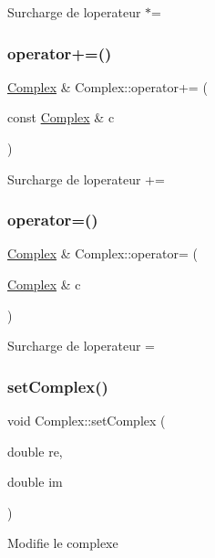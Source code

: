 Surcharge de l\textquotesingle{}operateur $\ast$= \mbox{\label{classComplex_ae567e20c39745c1bfe8f07be126a5fff}} 
\subsubsection{\texorpdfstring{operator+=()}{operator+=()}}
{\footnotesize\ttfamily \hyperlink{classComplex}{Complex} \& Complex\+::operator+= (\begin{DoxyParamCaption}\item[{const \hyperlink{classComplex}{Complex} \&}]{c }\end{DoxyParamCaption})}

Surcharge de l\textquotesingle{}operateur += \mbox{\label{classComplex_a77d1c64c8a3e4fe5d7c3e9ffcd666c7e}} 
\subsubsection{\texorpdfstring{operator=()}{operator=()}}
{\footnotesize\ttfamily \hyperlink{classComplex}{Complex} \& Complex\+::operator= (\begin{DoxyParamCaption}\item[{\hyperlink{classComplex}{Complex} \&}]{c }\end{DoxyParamCaption})}

Surcharge de l\textquotesingle{}operateur = \mbox{\label{classComplex_a6a8847542b73f8af12ae3c1f51fec64f}} 
\subsubsection{\texorpdfstring{set\+Complex()}{setComplex()}}
{\footnotesize\ttfamily void Complex\+::set\+Complex (\begin{DoxyParamCaption}\item[{double}]{re,  }\item[{double}]{im }\end{DoxyParamCaption})}

Modifie le complexe \mbox{\label{classComplex_aac52bfc17e87be68433b2bca83bb96f0}} 
